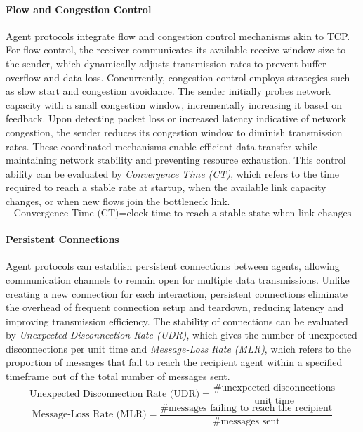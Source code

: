 \documentclass[10pt,preprint]{article}
\begin{document}
\paragraph{Flow and Congestion Control} Agent protocols integrate flow and congestion control mechanisms akin to TCP. For flow control, the receiver communicates its available receive window size to the sender, which dynamically adjusts transmission rates to prevent buffer overflow and data loss. Concurrently, congestion control employs strategies such as slow start and congestion avoidance. The sender initially probes network capacity with a small congestion window, incrementally increasing it based on feedback. Upon detecting packet loss or increased latency indicative of network congestion, the sender reduces its congestion window to diminish transmission rates. These coordinated mechanisms enable efficient data transfer while maintaining network stability and preventing resource exhaustion. This control ability can be evaluated by \textit{Convergence Time (CT)}, which refers to the time required to reach a stable rate at startup, when the available link capacity changes, or when new flows join the bottleneck link.
\begin{equation}
    \text{Convergence Time (CT)}=\text{clock time to reach a stable state when link changes}
\end{equation}

\paragraph{Persistent Connections} Agent protocols can establish persistent connections between agents, allowing communication channels to remain open for multiple data transmissions. Unlike creating a new connection for each interaction, persistent connections eliminate the overhead of frequent connection setup and teardown, reducing latency and improving transmission efficiency. The stability of connections can be evaluated by \textit{Unexpected Disconnection Rate (UDR)}, which gives the number of unexpected disconnections per unit time and \textit{Message-Loss Rate (MLR)}, which refers to the proportion of messages that fail to reach the recipient agent within a specified timeframe out of the total number of messages sent.
\begin{equation}
    \text{Unexpected Disconnection Rate (UDR)}=\frac{\#\text{unexpected disconnections}}{\text{unit time}}
\end{equation}
\begin{equation}
    \text{Message-Loss Rate (MLR)} = \frac{\#\text{messages failing to reach the recipient}}{\#\text{messages sent}}
\end{equation}
\end{document}
